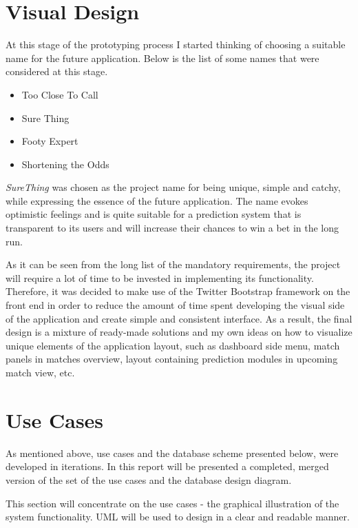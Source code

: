 \section{Visual Design}
\label{sec:visdesign_prototype}
At this stage of the prototyping process I started thinking of choosing a suitable name for the future application. Below is the list of some names that were considered at this stage.

\begin{itemize}
	\item Too Close To Call
	\item Sure Thing
	\item Footy Expert
	\item Shortening the Odds
\end{itemize}

\emph{SureThing} was chosen as the project name for being unique, simple and catchy, while expressing the essence of the future application. The name evokes optimistic feelings and is quite suitable for a prediction system that is transparent to its users and will increase their chances to win a bet in the long run. 

As it can be seen from the long list of the mandatory requirements, the project will require a lot of time to be invested in implementing its functionality. Therefore, it was decided to make use of the Twitter Bootstrap framework on the front end \citep{documentation:Bootstrap3} \citep{web:templateProgressus} in order to reduce the amount of time spent developing the visual side of the application and create simple and consistent interface. As a result, the final design is a mixture of ready-made solutions and my own ideas on how to visualize unique elements of the application layout, such as dashboard side menu, match panels in matches overview, layout containing prediction modules in upcoming match view, etc. 

\section{Use Cases}
\label{usecases_prototype}
As mentioned above, use cases and the database scheme presented below, were developed in iterations. In this report will be presented a completed, merged version of the set of the use cases and the database design diagram. 

This section will concentrate on the use cases - the graphical illustration of the system functionality. UML will be used to design in a clear and readable manner. 

